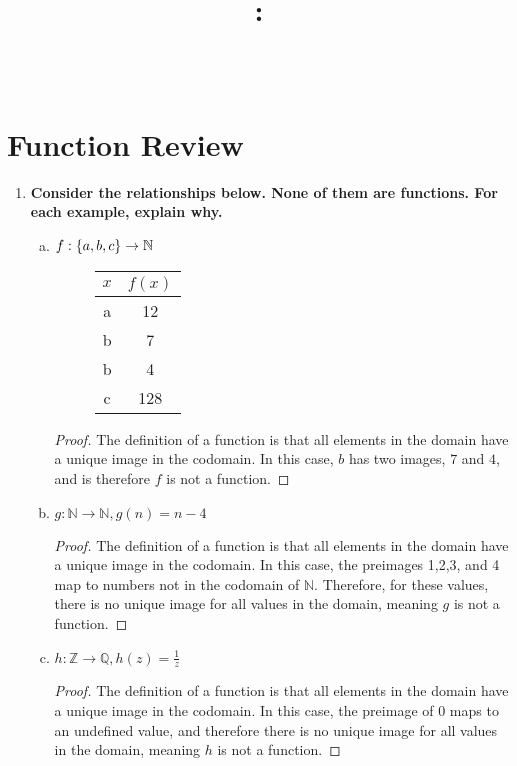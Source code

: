\documentclass[article, 12pt]{article}
\title{
    \vspace{2in}
    \textmd{\textbf{\courseNumber: \courseName}}
    \normalsize\vspace{0.1in}\\
    \vspace{0.1in}\Large{\text{\psetName}} \\
    \vspace{0.1in}\large{\text{\professor}}
    \vspace{3in}
}
\author{\name}
\date{\dueDate}
\theoremstyle{definition}
\newcommand{\df}{\displaystyle\frac} %
\DeclarePairedDelimiter\set{\{}{\}}
\newcommand{\ints}{\mathbb{Z}}
\newcommand{\nats}{\mathbb{N}}
\newcommand{\rats}{\mathbb{Q}}
\begin{document}
    \maketitle
    \thispagestyle{empty}
    \pagebreak

    \section{Function Review}
    \begin{enumerate}[(1)]
        \item \textbf{Consider the relationships below. None of them are functions. For each example, explain why.}
        \begin{enumerate}[(a)]
            \item $f: \set*{a, b, c} \to \nats$ 
            \begin{figure}[H]
                \centering
                \begin{tabular}{c|c}
                    $x$ & $f(x)$ \\
                    \hline
                    a & 12 \\
                    b & 7 \\
                    b & 4 \\
                    c & 128
                \end{tabular}
            \end{figure}
            \begin{proof}
                The definition of a function is that all elements in the domain have a unique image in the codomain. In this case, $b$ has two images, $7$ and $4$, and is therefore $f$ is not a function.
            \end{proof}
            \item $g: \nats \to \nats , g(n) = n-4$
            \begin{proof}
                The definition of a function is that all elements in the domain have a unique image in the codomain. In this case, the preimages 1,2,3, and 4 map to numbers not in the codomain of $\nats$. Therefore, for these values, there is no unique image for all values in the domain, meaning $g$ is not a function.
            \end{proof}
            \item $h: \ints \to \rats, h(z) = \df{1}{z}$
            \begin{proof}
                The definition of a function is that all elements in the domain have a unique image in the codomain. In this case, the preimage of 0 maps to an undefined value, and therefore there is no unique image for all values in the domain, meaning $h$ is not a function.

\end{proof}
\end{enumerate}
\end{enumerate}
\end{document}
